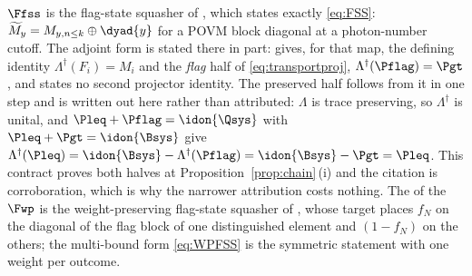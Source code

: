 \begin{remark}
\label{rem:published}
$\Ffss$ is the flag-state squasher of \cite[Thm.~1, Eq.~(8)]{zhang2021security},
which states exactly \eqref{eq:FSS}: $\widetilde M_y=M_{y,n\le k}\oplus
\dyad{y}$ for a POVM block diagonal at a photon-number cutoff. The adjoint
form is stated there in part: \cite[Eqs.~(149)--(150)]{tupkary2026decoy}
gives, for that map, the defining identity $\Lambda^{\dagger}(F_i)=M_i$ and the
\emph{flag} half of \eqref{eq:transportproj},
$\Lambda^{\dagger}(\Pflag)=\Pgt$, and states no second projector identity. The
preserved half follows from it in one step and is written out here rather than
attributed: $\Lambda$ is trace preserving, so $\Lambda^{\dagger}$ is unital, and
$\Pleq+\Pflag=\idon{\Qsys}$ with $\Pleq+\Pgt=\idon{\Bsys}$ give
$\Lambda^{\dagger}(\Pleq)=\idon{\Bsys}-\Lambda^{\dagger}(\Pflag)
=\idon{\Bsys}-\Pgt=\Pleq$. This contract proves both halves at
Proposition~\ref{prop:chain}\,(i) and the citation is corroboration, which is
why the narrower attribution costs nothing. The  of
the  $\Fwp$
is the weight-preserving flag-state squasher of
\cite[Lemma~7, Eqs.~(28)--(29)]{nahar2024postselection}, whose target places
$f_N$ on the diagonal of the flag block of one distinguished element and
$(1-f_N)$ on the others; the multi-bound form \eqref{eq:WPFSS} is the
symmetric statement with one weight per outcome.


\end{remark}
